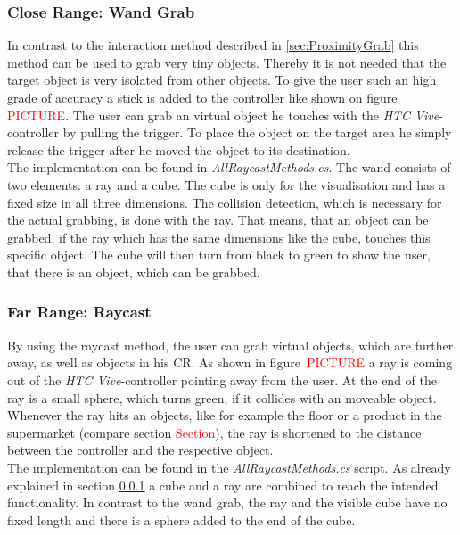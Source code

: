 \subsubsection{Close Range: Wand Grab} \label{sec:WandGrab}
In contrast to the interaction method described in \ref{sec:ProximityGrab} this method can be used to grab very tiny objects. Thereby it is not needed that the target object is very isolated from other objects. To give the user such an high grade of accuracy a stick is added to the controller like shown on figure \textcolor{red}{PICTURE}. The user can grab an virtual object he touches with the \textit{HTC Vive}-controller by pulling the trigger. To place the object on the target area he simply release the trigger after he moved the object to its destination. \\
The implementation can be found in \textit{AllRaycastMethods.cs}. The wand consists of two elements: a ray \cite{website:Ray} and a cube. The cube is only for the visualisation and has a fixed size in all three dimensions. The collision detection, which is necessary for the actual grabbing, is done with the ray. That means, that an object can be grabbed, if the ray which has the same dimensions like the cube, touches this specific object. The cube will then turn from black to green to show the user, that there is an object, which can be grabbed.

\subsubsection{Far Range: Raycast} \label{sec:Raycast}
By using the raycast method, the user can grab virtual objects, which are further away, as well as objects in his CR. As shown in figure~\textcolor{red}{PICTURE} a ray is coming out of the \textit{HTC Vive}-controller pointing away from the user. At the end of the ray is a small sphere, which turns green, if it collides with an moveable object. Whenever the ray hits an objects, like for example the floor or a product in the supermarket (compare section \textcolor{red}{Section}), the ray is shortened to the distance between the controller and the respective object. \\
The implementation can be found in the \textit{AllRaycastMethods.cs} script. As already explained in section \ref{sec:WandGrab} a cube and a ray are combined to reach the intended functionality. In contrast to the wand grab, the ray and the visible cube have no fixed length and there is a sphere added to the end of the cube.


